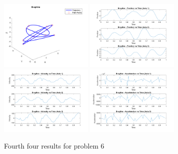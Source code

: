 \documentclass[conference]{IEEEtran}
\begin{document}
\begin{figure}[htbp]
    \centering
    \includegraphics[width=0.4\textwidth]{figures/prob6/fig_13.png}
    \includegraphics[width=0.4\textwidth]{figures/prob6/fig_14.png}
    \includegraphics[width=0.4\textwidth]{figures/prob6/fig_15.png}
    \includegraphics[width=0.4\textwidth]{figures/prob6/fig_16.png}
    \caption{Fourth four results for problem 6}
    \label{fig:res10}
\end{figure}
\end{document}
